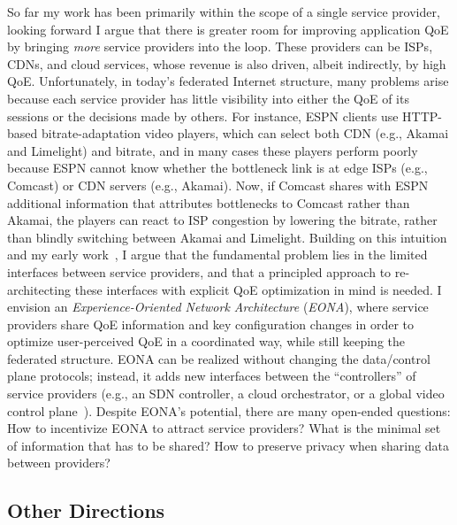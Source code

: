 So far my work has been primarily within the scope of a single service provider, looking forward I argue that there is greater room for improving application QoE by bringing {\em more} service providers into the loop. These providers can be ISPs, CDNs, and cloud services, whose revenue is also driven, albeit indirectly, by high QoE.
Unfortunately, in today's federated Internet structure, many problems arise because each service provider has little visibility into either the QoE of its sessions or the decisions made by others.
For instance, ESPN clients use HTTP-based bitrate-adaptation video players, which can select both CDN (e.g., Akamai and Limelight) and bitrate, and in many cases these players perform poorly because ESPN cannot know whether the bottleneck link is at edge ISPs (e.g., Comcast) or CDN servers (e.g., Akamai).
Now, if Comcast shares with ESPN additional information that attributes bottlenecks to Comcast rather than Akamai, the players can react to ISP congestion by lowering the bitrate, rather than blindly switching between Akamai and Limelight. 
Building on this intuition and my early work~\cite{eona}, I argue that the fundamental problem lies in the limited interfaces between service providers, and that a principled approach to re-architecting these interfaces with explicit QoE optimization in mind is needed.
I envision an {\em Experience-Oriented Network Architecture} ({\em EONA}), where service providers share QoE information and key configuration changes in order to optimize user-perceived QoE in a coordinated way, while still keeping the federated structure.
EONA can be realized without changing the data/control plane protocols; instead, it adds new interfaces between the ``controllers'' of service providers (e.g., an SDN controller, a cloud orchestrator, or a global video control plane~\cite{sigcomm12conviva}).
Despite EONA's potential, there are many open-ended questions: 
How to incentivize EONA to attract service providers?
What is the minimal set of information that has to be shared? 
How to preserve privacy when sharing data between providers?

\subsection{Other Directions}

